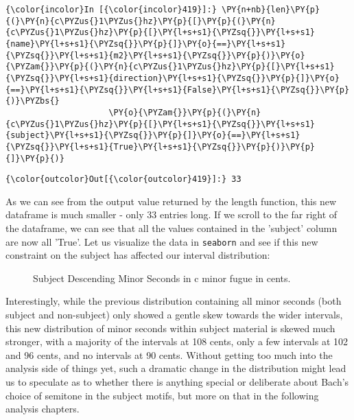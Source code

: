     \begin{Verbatim}[commandchars=\\\{\}]
{\color{incolor}In [{\color{incolor}419}]:} \PY{n+nb}{len}\PY{p}{(}\PY{n}{c\PYZus{}1\PYZus{}hz}\PY{p}{[}\PY{p}{(}\PY{n}{c\PYZus{}1\PYZus{}hz}\PY{p}{[}\PY{l+s+s1}{\PYZsq{}}\PY{l+s+s1}{name}\PY{l+s+s1}{\PYZsq{}}\PY{p}{]}\PY{o}{==}\PY{l+s+s1}{\PYZsq{}}\PY{l+s+s1}{m2}\PY{l+s+s1}{\PYZsq{}}\PY{p}{)}\PY{o}{\PYZam{}}\PY{p}{(}\PY{n}{c\PYZus{}1\PYZus{}hz}\PY{p}{[}\PY{l+s+s1}{\PYZsq{}}\PY{l+s+s1}{direction}\PY{l+s+s1}{\PYZsq{}}\PY{p}{]}\PY{o}{==}\PY{l+s+s1}{\PYZsq{}}\PY{l+s+s1}{False}\PY{l+s+s1}{\PYZsq{}}\PY{p}{)}\PYZbs{}
                     \PY{o}{\PYZam{}}\PY{p}{(}\PY{n}{c\PYZus{}1\PYZus{}hz}\PY{p}{[}\PY{l+s+s1}{\PYZsq{}}\PY{l+s+s1}{subject}\PY{l+s+s1}{\PYZsq{}}\PY{p}{]}\PY{o}{==}\PY{l+s+s1}{\PYZsq{}}\PY{l+s+s1}{True}\PY{l+s+s1}{\PYZsq{}}\PY{p}{)}\PY{p}{]}\PY{p}{)}
\end{Verbatim}
\begin{Verbatim}[commandchars=\\\{\}]
{\color{outcolor}Out[{\color{outcolor}419}]:} 33
\end{Verbatim}
    As we can see from the output value returned by the length function,
this new dataframe is much smaller - only 33 entries long. If we scroll
to the far right of the dataframe, we can see that all the values
contained in the 'subject' column are now all 'True'. Let us visualize
the data in \texttt{seaborn} and see if this new constraint on the
subject has affected our interval distribution:




\begin{figure}[H]
\vspace{1.5em}
    \centering
    \caption{ Subject Descending Minor Seconds in c minor fugue in cents. }
\end{figure}    Interestingly, while the previous distribution containing all minor
seconds (both subject and non-subject) only showed a gentle skew towards
the wider intervals, this new distribution of minor seconds within
subject material is skewed much stronger, with a majority of the
intervals at 108 cents, only a few intervals at 102 and 96 cents, and no
intervals at 90 cents. Without getting too much into the analysis side
of things yet, such a dramatic change in the distribution might lead us
to speculate as to whether there is anything special or deliberate about
Bach's choice of semitone in the subject motifs, but more on that in the
following analysis chapters.

